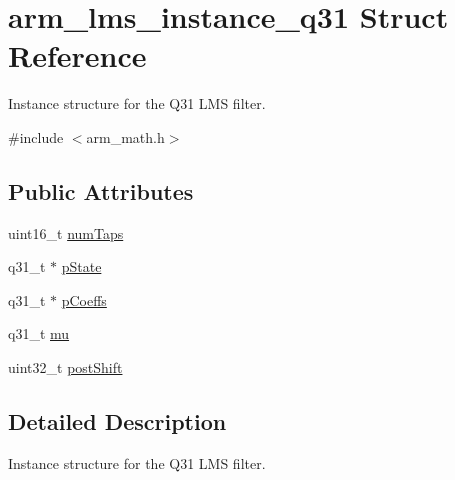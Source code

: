 \hypertarget{structarm__lms__instance__q31}{\section{arm\-\_\-lms\-\_\-instance\-\_\-q31 Struct Reference}
\label{structarm__lms__instance__q31}
}


Instance structure for the Q31 L\-M\-S filter.  




{\ttfamily \#include $<$arm\-\_\-math.\-h$>$}

\subsection*{Public Attributes}
\begin{DoxyCompactItemize}
\item 
uint16\-\_\-t \hyperlink{structarm__lms__instance__q31_ac0d84f7d054555931ef8a62511fbcb8a}{num\-Taps}
\item 
q31\-\_\-t $\ast$ \hyperlink{structarm__lms__instance__q31_a206d47b49de6f357f933ebe61520753c}{p\-State}
\item 
q31\-\_\-t $\ast$ \hyperlink{structarm__lms__instance__q31_a4afe56e991a5416adfd462aa88bda500}{p\-Coeffs}
\item 
q31\-\_\-t \hyperlink{structarm__lms__instance__q31_acb6ca9996b3c5f740d5d6c8e9f4f1d46}{mu}
\item 
uint32\-\_\-t \hyperlink{structarm__lms__instance__q31_a4705a8f0011bb9166e09bf5bd51e595e}{post\-Shift}
\end{DoxyCompactItemize}


\subsection{Detailed Description}
Instance structure for the Q31 L\-M\-S filter. 

